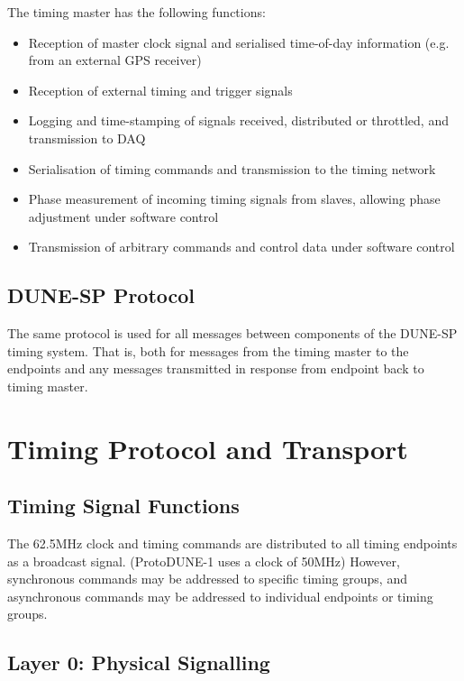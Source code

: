 \documentclass[a4paper,11pt]{article}
\begin{document}
The timing master has the following functions:

\begin{itemize}
	\item Reception of master clock signal and serialised time-of-day information (e.g. from an external GPS receiver)
	\item Reception of external timing and trigger signals
	\item Logging and time-stamping of signals received, distributed or throttled, and transmission to DAQ
	\item Serialisation of timing commands and transmission to the timing network
	\item Phase measurement of incoming timing signals from slaves, allowing phase adjustment under software control
	\item Transmission of arbitrary commands and control data under software control
\end{itemize}

\subsection{DUNE-SP Protocol}

The same protocol is used for all messages between components of the DUNE-SP timing system. That is, both for messages from the timing master to the endpoints and any messages transmitted in response from endpoint back to timing master.



\section{Timing Protocol and Transport}

\subsection{Timing Signal Functions}

The 62.5MHz clock and timing commands are distributed to all timing endpoints as a broadcast signal. (ProtoDUNE-1 uses a clock of 50MHz) However, synchronous commands may be addressed to specific timing groups, and asynchronous commands may be addressed to individual endpoints or timing groups.



\subsection{Layer 0: Physical Signalling}
\end{document}
